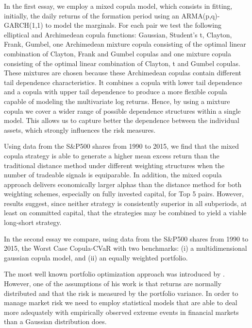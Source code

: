 \documentclass[a4paper,12pt]{report}
\begin{document}
	In the first essay, we employ a mixed copula model, which consists in fitting, initially, the daily returns of the formation period using an ARMA(p,q)-GARCH(1,1) to model the marginals. For each pair we test the following elliptical and Archimedean copula functions: Gaussian, Student's t, Clayton, Frank, Gumbel, one Archimedean mixture copula consisting of the optimal linear combination of Clayton, Frank and Gumbel copulas and one mixture copula consisting of the optimal linear combination of Clayton, t and Gumbel copulas. These mixtures are chosen because these Archimedean copulas contain different tail dependence characteristics. It combines a copula with lower tail dependence and a copula with upper tail dependence to produce a more flexible copula capable of modeling the multivariate log returns. Hence, by using a mixture copula we cover a wider range of possible dependence structures within a single model. This allows us to capture better the dependence between the individual assets, which strongly influences the risk measures.
	
	Using data from the S\&P500 shares from 1990 to 2015, we find that the mixed copula strategy is able to generate a higher mean excess return than the traditional distance method under different weighting structures when the number of tradeable signals is equiparable. In addition, the mixed copula approach delivers economically larger alphas than the distance method for both weighting schemes, especially on fully invested capital, for Top 5 pairs. However, results suggest, since neither strategy is consistently superior in all subperiods, at least on committed capital, that the strategies may be combined to yield a viable long-short strategy.
	
	In the second essay we compare, using data from the S\&P500 shares from 1990 to 2015, the Worst Case Copula-CVaR with two benchmarks: (i) a multidimensional gaussian copula model, and (ii) an equally weighted portfolio. 
	
	The most well known portfolio optimization approach was introduced by \citet*{markowitz1952}. However, one of the assumptions of his work is that returns are normally distributed and that the risk is measured by the portfolio variance. In order to manage market risk we need to employ statistical models that are able to deal more adequately with empirically observed extreme events in financial markets than a Gaussian distribution does.
	
\end{document}
